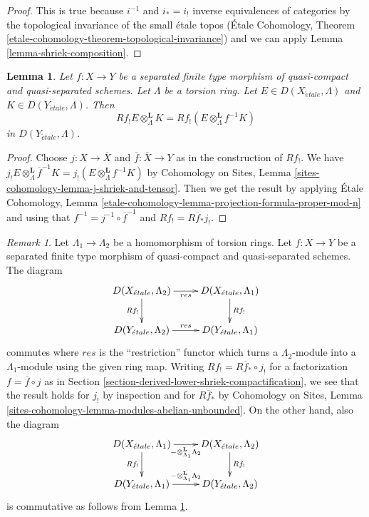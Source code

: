 \documentclass{stacks-project}
\theoremstyle{plain}
\newtheorem{lemma}[subsection]{Lemma}
\theoremstyle{definition}
\theoremstyle{remark}
\newtheorem{remark}[subsection]{Remark}
\numberwithin{equation}{subsection}
\def\etale{{\acute{e}tale}}
\begin{document}
\begin{proof}
This is true because $i^{-1}$ and $i_* = i_!$ inverse equivalences
of categories by the topological invariance of the small \'etale topos
(\'Etale Cohomology, Theorem
\ref{etale-cohomology-theorem-topological-invariance})
and we can apply
Lemma \ref{lemma-shriek-composition}.
\end{proof}

\begin{lemma}
\label{lemma-projection-formula-Rf-lower-shriek}
Let $f : X \to Y$ be a separated finite type morphism of quasi-compact
and quasi-separated schemes. Let $\Lambda$ be a torsion ring. Let
$E \in D(X_\etale, \Lambda)$ and $K \in D(Y_\etale, \Lambda)$. Then
$$
Rf_!E \otimes_\Lambda^\mathbf{L} K =
Rf_!(E \otimes_\Lambda^\mathbf{L} f^{-1}K)
$$
in $D(Y_\etale, \Lambda)$.
\end{lemma}

\begin{proof}
Choose $j : X \to \overline{X}$ and $\overline{f} : \overline{X} \to Y$
as in the construction of $Rf_!$. We have
$j_!E \otimes_\Lambda^\mathbf{L} \overline{f}^{-1}K =
j_!(E \otimes_\Lambda^\mathbf{L} f^{-1}K)$ by
Cohomology on Sites, Lemma \ref{sites-cohomology-lemma-j-shriek-and-tensor}.
Then we get the result by applying
\'Etale Cohomology, Lemma
\ref{etale-cohomology-lemma-projection-formula-proper-mod-n}
and using that $f^{-1} = j^{-1} \circ \overline{f}^{-1}$ and
$Rf_! = R\overline{f}_*j_!$.
\end{proof}

\begin{remark}
\label{remark-Rf-lower-shriek-change-of-rings}
Let $\Lambda_1 \to \Lambda_2$ be a homomorphism of torsion rings.
Let $f : X \to Y$ be a separated finite type morphism of quasi-compact
and quasi-separated schemes. The diagram
$$
\xymatrix{
D(X_\etale, \Lambda_2) \ar[r]_{res} \ar[d]_{Rf_!} &
D(X_\etale, \Lambda_1) \ar[d]^{Rf_!} \\
D(Y_\etale, \Lambda_2) \ar[r]^{res} &
D(Y_\etale, \Lambda_1)
}
$$
commutes where $res$ is the ``restriction'' functor which turns a
$\Lambda_2$-module into a $\Lambda_1$-module using the given ring map.
Writing $Rf_! = R\overline{f}_* \circ j_!$ for a factorization
$f = \overline{f} \circ j$ as in
Section \ref{section-derived-lower-shriek-compactification}, we see that
the result holds for $j_!$ by inspection and for $R\overline{f}_*$
by Cohomology on Sites, Lemma
\ref{sites-cohomology-lemma-modules-abelian-unbounded}.
On the other hand, also the diagram
$$
\xymatrix{
D(X_\etale, \Lambda_1)
\ar[r]_{- \otimes_{\Lambda_1}^\mathbf{L} \Lambda_2} \ar[d]_{Rf_!} &
D(X_\etale, \Lambda_2) \ar[d]^{Rf_!} \\
D(Y_\etale, \Lambda_1)
\ar[r]^{- \otimes_{\Lambda_1}^\mathbf{L} \Lambda_2} &
D(Y_\etale, \Lambda_2)
}
$$
is commutative as follows from
Lemma \ref{lemma-projection-formula-Rf-lower-shriek}.
\end{remark}
\end{document}
